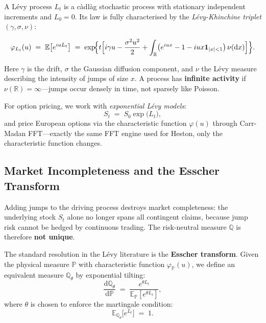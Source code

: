 \documentclass[12pt, a4paper]{article}
\begin{document}
A L\'evy process $L_t$ is a c\`adl\`ag stochastic process with stationary independent increments and $L_0 = 0$. Its law is fully characterised by the \emph{L\'evy-Khinchine triplet} $(\gamma, \sigma, \nu)$:

\begin{equation}
\varphi_{L_t}(u) \;=\; \mathbb{E}\bigl[e^{iuL_t}\bigr]
\;=\; \exp\!\Bigl\{ t\Bigl[ i\gamma u - \frac{\sigma^2 u^2}{2}
+ \int_{\mathbb{R}} \bigl(e^{iux} - 1 - iux\mathbf{1}_{|x|<1}\bigr)\,\nu(\mathrm{d}x)\Bigr]\Bigr\}.
\label{eq:levy-khinchine}
\end{equation}

Here $\gamma$ is the drift, $\sigma$ the Gaussian diffusion component, and $\nu$ the L\'evy measure describing the intensity of jumps of size $x$. A process has \textbf{infinite activity} if $\nu(\mathbb{R}) = \infty$---jumps occur densely in time, not sparsely like Poisson.

For option pricing, we work with \emph{exponential L\'evy models}:
\begin{equation}
S_t \;=\; S_0 \exp\bigl(L_t\bigr),
\end{equation}
and price European options via the characteristic function $\varphi(u)$ through Carr-Madan FFT---exactly the same FFT engine used for Heston, only the characteristic function changes.

\subsection{Market Incompleteness and the Esscher Transform}
\label{subsec:esscher}

Adding jumps to the driving process destroys market completeness: the underlying stock $S_t$ alone no longer spans all contingent claims, because jump risk cannot be hedged by continuous trading. The risk-neutral measure $\mathbb{Q}$ is therefore \textbf{not unique}.

The standard resolution in the L\'evy literature is the \textbf{Esscher transform}. Given the physical measure $\mathbb{P}$ with characteristic function $\varphi_{\mathbb{P}}(u)$, we define an equivalent measure $\mathbb{Q}_\theta$ by exponential tilting:
\begin{equation}
\frac{\mathrm{d}\mathbb{Q}_\theta}{\mathrm{d}\mathbb{P}}
\;=\;
\frac{e^{\theta L_t}}{\mathbb{E}_{\mathbb{P}}[e^{\theta L_t}]},
\end{equation}
where $\theta$ is chosen to enforce the martingale condition:
\begin{equation}
\mathbb{E}_{\mathbb{Q}_\theta}\bigl[e^{L_t}\bigr] \;=\; 1.
\label{eq:esscher-martingale}
\end{equation}
\end{document}
